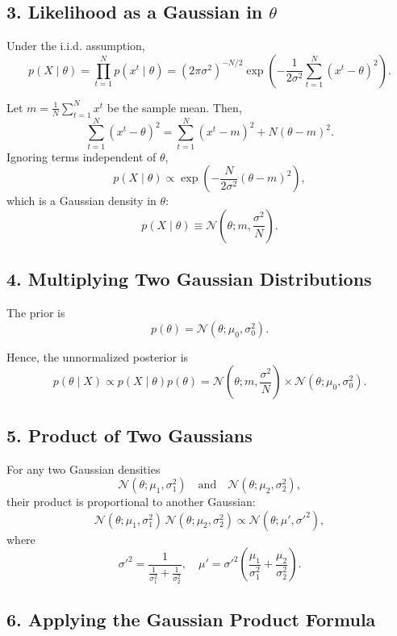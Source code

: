 \documentclass[12pt,a4paper]{article}
\begin{document}
\subsection*{3. Likelihood as a Gaussian in \(\theta\)}

Under the i.i.d. assumption,
\[
p(X \mid \theta) = \prod_{t=1}^N p(x^t \mid \theta)
= (2\pi\sigma^2)^{-N/2} \exp\!\left(-\frac{1}{2\sigma^2}\sum_{t=1}^N (x^t - \theta)^2\right).
\]

Let \( m = \frac{1}{N}\sum_{t=1}^N x^t \) be the sample mean.  
Then,
\[
\sum_{t=1}^N (x^t - \theta)^2
= \sum_{t=1}^N (x^t - m)^2 + N(\theta - m)^2.
\]
Ignoring terms independent of \( \theta \),
\[
p(X \mid \theta) \propto \exp\!\left(-\frac{N}{2\sigma^2}(\theta - m)^2\right),
\]
which is a Gaussian density in \( \theta \):
\[
p(X \mid \theta) \equiv \mathcal{N}\!\left(\theta; m, \frac{\sigma^2}{N}\right).
\]



\subsection*{4. Multiplying Two Gaussian Distributions}

The prior is
\[
p(\theta) = \mathcal{N}(\theta; \mu_0, \sigma_0^2).
\]

Hence, the unnormalized posterior is
\[
p(\theta \mid X) \propto p(X \mid \theta)p(\theta)
= \mathcal{N}\!\left(\theta; m, \frac{\sigma^2}{N}\right)
  \times \mathcal{N}\!\left(\theta; \mu_0, \sigma_0^2\right).
\]



\subsection*{5. Product of Two Gaussians}

For any two Gaussian densities
\[
\mathcal{N}(\theta; \mu_1, \sigma_1^2)
\quad \text{and} \quad
\mathcal{N}(\theta; \mu_2, \sigma_2^2),
\]
their product is proportional to another Gaussian:
\[
\mathcal{N}(\theta; \mu_1, \sigma_1^2)\,
\mathcal{N}(\theta; \mu_2, \sigma_2^2)
\propto
\mathcal{N}(\theta; \mu', \sigma'^2),
\]
where
\[
\sigma'^2 = \frac{1}{\frac{1}{\sigma_1^2} + \frac{1}{\sigma_2^2}},
\quad
\mu' = \sigma'^2\!\left(\frac{\mu_1}{\sigma_1^2} + \frac{\mu_2}{\sigma_2^2}\right).
\]



\subsection*{6. Applying the Gaussian Product Formula}
\end{document}
